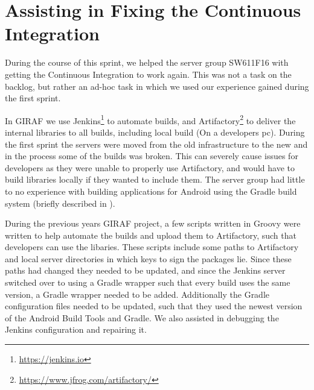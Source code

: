 \section{Assisting in Fixing the Continuous Integration}
During the course of this sprint, we helped the server group SW611F16 with getting the Continuous Integration  to work again. 
This was not a task on the backlog, but rather an ad-hoc task in which we used our experience gained during the first sprint.  

In GIRAF we use Jenkins\footnote{\url{https://jenkins.io}} to automate builds, and Artifactory\footnote{\url{https://www.jfrog.com/artifactory/}} to deliver the internal libraries to all builds, including local build (On a developers pc). 
During the first sprint the servers were moved from the old infrastructure to the new and in the process some of the builds was broken. 
This can severely cause issues for developers as they were unable to properly use Artifactory, and would have to build libraries locally if they wanted to include them.
The server group had little to no experience with building applications for Android using the Gradle build system (briefly described in ). 

During the previous years GIRAF project, a few scripts written in Groovy were written to help automate the builds and upload them to Artifactory, such that developers can use the libaries.
These scripts include some paths to Artifactory and local server directories in which keys to sign the packages lie. 
Since these paths had changed they needed to be updated, and since the Jenkins server switched over to using a Gradle wrapper such that every build uses the same version, a Gradle wrapper needed to be added. 
Additionally the Gradle configuration files needed to be updated, such that they used the newest version of the Android Build Tools and Gradle. 
We also assisted in debugging the Jenkins configuration and repairing it. 
